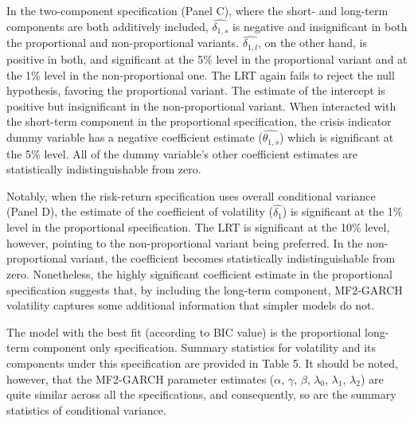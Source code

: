 \documentclass[12pt]{article}
\begin{document}
In the two-component specification (Panel C), where the short- and long-term components are both additively included, $\widehat{\delta_{1,s}}$ is negative and insignificant in both the proportional and non-proportional variants. $\widehat{\delta_{1,l}}$, on the other hand, is positive in both, and significant at the 5\% level in the proportional variant and at the 1\% level in the non-proportional one. The LRT again fails to reject the null hypothesis, favoring the proportional variant. The estimate of the intercept is positive but insignificant in the non-proportional variant. When interacted with the short-term component in the proportional specification, the crisis indicator dummy variable has a negative coefficient estimate ($\widehat{\theta_{1,s}}$) which is significant at the 5\% level. All of the dummy variable's other coefficient estimates are statistically indistinguishable from zero.\par
Notably, when the risk-return specification uses overall conditional variance (Panel D), the estimate of the coefficient of volatility ($\widehat{\delta_1}$) is significant at the 1\% level in the proportional specification. The LRT is significant at the 10\% level, however, pointing to the non-proportional variant being preferred. In the non-proportional variant, the coefficient becomes statistically indistinguishable from zero. Nonetheless, the highly significant coefficient estimate in the proportional specification suggests that, by including the long-term component, MF2-GARCH volatility captures some additional information that simpler models do not.\par
The model with the best fit (according to BIC value) is the proportional long-term component only specification. Summary statistics for volatility and its components under this specification are provided in Table 5. It should be noted, however, that the MF2-GARCH parameter estimates ($\alpha$, $\gamma$, $\beta$, $\lambda_0$, $\lambda_1$, $\lambda_2$) are quite similar across all the specifications, and consequently, so are the summary statistics of conditional variance.
\end{document}
